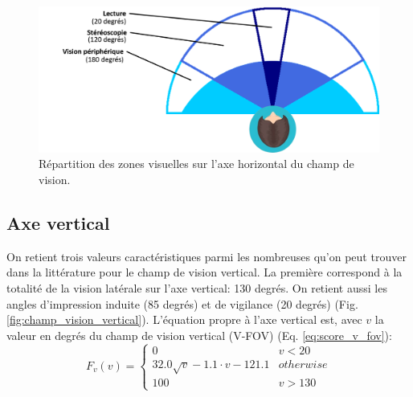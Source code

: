 	\begin{figure}
		\centering
		\includegraphics[scale=.5]{Figures/ChampVisionHorizontal}
		\caption{Répartition des zones visuelles sur l'axe horizontal du champ de vision.}
		\label{fig:champ_vision_horizontal}
	\end{figure}

	\subsection{Axe vertical}
	\par On retient trois valeurs caractéristiques parmi les nombreuses qu'on peut trouver dans la littérature pour le champ de vision vertical. La première correspond à la totalité de la vision latérale sur l'axe vertical: 130 degrés. On retient aussi les angles d'impression induite (85 degrés) et de vigilance (20 degrés) \citep{langlois_adas_2013} (Fig. \ref{fig:champ_vision_vertical}). L'équation propre à l'axe vertical est, avec $v$ la valeur en degrés du champ de vision vertical (V-FOV) (Eq. \ref{eq:score_v_fov}): 
	\begin{equation}
	F_v(v) = \begin{cases}
	0 & v < 20\\
	32.0 \sqrt{v} -1.1 \cdot v -121.1 & otherwise\\
	100 & v > 130
	\end{cases}
	\label{eq:score_v_fov}
	\end{equation}
	
